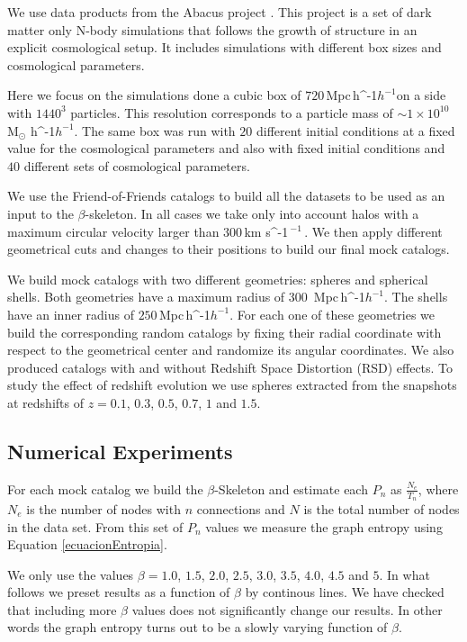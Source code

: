\documentclass[fleqn,usenatbib]{mnras}
\newcommand{\Msunh}{\,{\rm M}$_{\odot}$\,\,\ifmmode h^{-1}\else $h^{-1}$\fi}
\newcommand{\kms}{\,{\rm km s}\ifmmode ^{-1}\,\else $^{-1}$\,\fi}
\newcommand{\Mpch}{\,{\rm Mpc}\,\ifmmode h^{-1}\else $h^{-1}$\fi}
\begin{document}
We use data products from the Abacus project \citep{abacus}.
This project is a set of dark matter only N-body simulations that follows
the growth of structure in an explicit cosmological setup.
It includes simulations with different box sizes and cosmological parameters.

Here we focus on the simulations done a cubic box of $720$\Mpch on a side
with $1440^3$ particles. 
This resolution corresponds to a particle mass of $\sim1\times10^{10}$ \Msunh.
The same box was run with $20$ different initial conditions at a fixed value for
the cosmological parameters and also with fixed initial conditions and $40$ different
sets of cosmological parameters.

We use the Friend-of-Friends catalogs to build all the datasets to be used
as an input to the $\beta$-skeleton. In all cases we take only into account halos
with a maximum circular velocity larger than $300$\kms. 
We then apply different geometrical cuts and changes to their positions to build 
our final mock catalogs.

We build mock catalogs with two different geometries: spheres and spherical shells.
Both geometries have a maximum radius of $300$ \Mpch.
The shells have an inner radius of $250$\Mpch.
For each one of these geometries we build the corresponding random catalogs
by fixing their radial coordinate with respect to the geometrical center and 
randomize its angular coordinates.
We also produced catalogs with and without Redshift Space Distortion (RSD) effects. 
To study the effect of redshift evolution we use spheres extracted from
the snapshots at redshifts of $z=0.1$, $0.3$, $0.5$, $0.7$, $1$ and $1.5$.



\subsection{Numerical Experiments}

For each mock catalog we build the $\beta$-Skeleton and estimate each $P_n$ as  $\frac{N_e}{T_n}$, where $N_e$ is the number of nodes with $n$ connections and $N$ is the
total number of nodes in the data set.
From this set of $P_n$ values we measure the graph entropy using Equation \ref{ecuacionEntropia}.

We only use the values $\beta=1.0$, $1.5$, $2.0$, $2.5$, $3.0$, $3.5$, $4.0$, $4.5$ and $5$.
In what follows we preset results as a function of $\beta$ by continous lines.
We have checked that including more $\beta$ values does not significantly change
our results. 
In other words the graph entropy turns out to be a slowly varying function of $\beta$.
\end{document}
